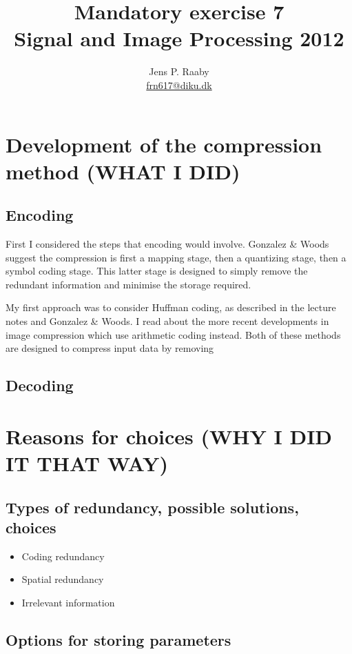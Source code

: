 \documentclass[a4paper]{article}
\title{Mandatory exercise 7 \\
Signal and Image Processing 2012}
\author{Jens P. Raaby \\
\url{frn617@diku.dk}}
\begin{document}
 
\maketitle

\section{Development of the compression method (WHAT I DID)}
\subsection{Encoding}
First I considered the steps that encoding would involve. Gonzalez \& Woods suggest the compression is first a mapping stage, then a quantizing stage, then a symbol coding stage. This latter stage is designed to simply remove the redundant information and minimise the storage required.

My first approach was to consider Huffman coding, as described in the lecture notes and Gonzalez \& Woods. I read about the more recent developments in image compression which use arithmetic coding instead. Both of these methods are designed to compress input data by removing


\subsection{Decoding}

\section{Reasons for choices (WHY I DID IT THAT WAY)}
\subsection{Types of redundancy, possible solutions, choices}
\begin{itemize}

    \item Coding redundancy


    \item Spatial redundancy


    \item Irrelevant information
\end{itemize}

\subsection{Options for storing parameters}
\end{document}
